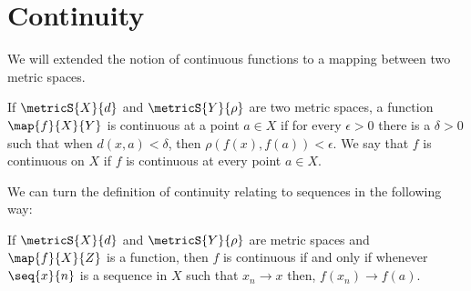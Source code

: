 \section{Continuity}
We will extended the notion of continuous functions to a mapping between two metric spaces.
\begin{Definition}[name=Continuous function]
    If $\metricS{X}{d}$ and $\metricS{Y}{\rho}$ are two metric spaces, a function $\map{f}{X}{Y}$ is
    continuous at a point $a \in X$ if for every $\epsilon > 0$ there is a $\delta > 0$ such that when 
    $d(x,a) < \delta$, then $\rho(f(x),f(a)) < \epsilon$. We say that $f$ is continuous on $X$ if $f$ is
    continuous at every point $a \in X$.
\end{Definition}
We can turn the definition of continuity relating to sequences in the following way:
\begin{Proposition}
    If $\metricS{X}{d}$ and $\metricS{Y}{\rho}$ are metric spaces and $\map{f}{X}{Z}$ is a function, then
    $f$ is continuous if and only if whenever $\seq{x}{n}$ is a sequence in $X$ such that $x_n\to x$ then,
    $f(x_n)\to f(a)$.
\end{Proposition}
